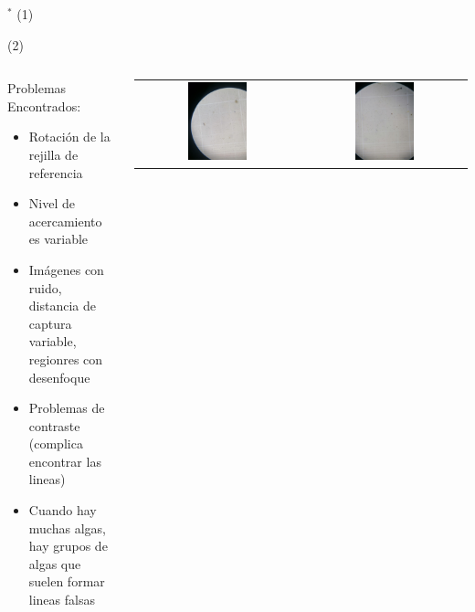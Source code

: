 \begin{frame}{$^*$ (1)}
\end{frame}


\begin{frame}{ (2)}
\begin{columns}
\begin{column}{0.6\textwidth}
Problemas Encontrados:
\begin{itemize}
        \item Rotación de la rejilla de referencia
        \item Nivel de acercamiento es variable
		\item Imágenes con ruido, distancia de captura variable, regionres con desenfoque 
        \item Problemas de contraste (complica encontrar las lineas)
        \item Cuando hay muchas algas, hay grupos de algas que suelen formar lineas falsas
	\end{itemize}
\end{column}
\begin{column}{0.4\textwidth}  
\begin{center}
     \begin{tabular}{cc}
         \includegraphics[width=0.38\textwidth]{2022_ConteoMicroAlgas/figs/CuadranteA}&
         \includegraphics[width=0.38\textwidth]{2022_ConteoMicroAlgas/figs/CuadranteB}\\

\end{tabular}
\end{center}
\end{column}
\end{columns}
\end{frame}
